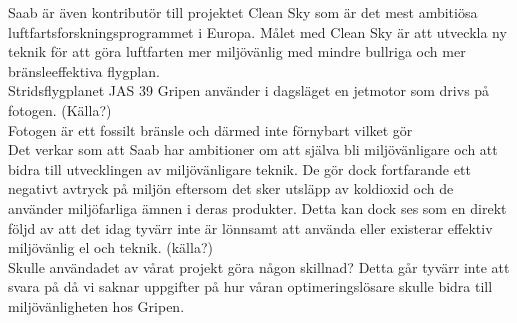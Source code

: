 Saab är även kontributör till projektet Clean Sky som är det mest ambitiösa luftfartsforskningsprogrammet i Europa. Målet med Clean Sky är att utveckla ny teknik för att göra luftfarten mer miljövänlig med mindre bullriga och mer bränsleeffektiva flygplan. \citep{cleansky}     
\\
Stridsflygplanet JAS 39 Gripen använder i dagsläget en jetmotor som drivs på fotogen. (Källa?)
\\
Fotogen är ett fossilt bränsle och därmed inte förnybart vilket gör
\\
Det verkar som att Saab har ambitioner om att själva bli miljövänligare och att bidra till utvecklingen av miljövänligare teknik. De gör dock fortfarande ett negativt avtryck på miljön eftersom det sker utsläpp av koldioxid och de använder miljöfarliga ämnen i deras produkter. Detta kan dock ses som en direkt följd av att det idag tyvärr inte är lönnsamt att använda eller existerar effektiv miljövänlig el och teknik. (källa?)   
\\
Skulle användadet av vårat projekt göra någon skillnad? Detta går tyvärr inte att svara på då vi saknar uppgifter på hur våran optimeringslösare skulle bidra till miljövänligheten hos Gripen.   
     